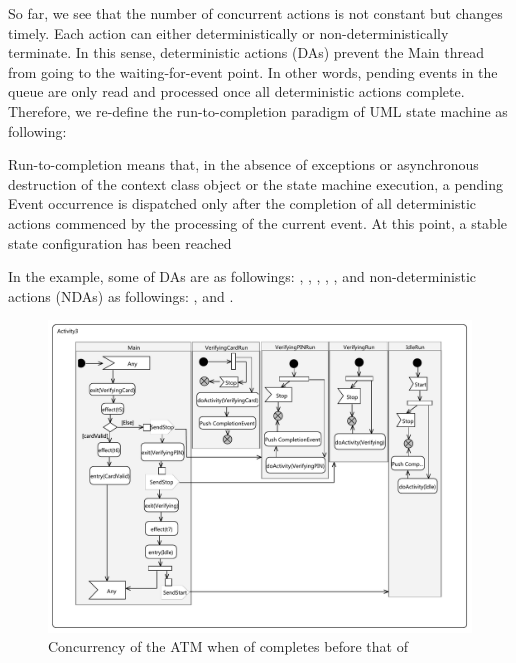 So far, we see that the number of concurrent actions is not constant but changes timely. 
Each action can either deterministically or non-deterministically terminate. 
In this sense, deterministic actions (DAs) prevent the Main thread from going to the waiting-for-event point. 
In other words, pending events in the queue are only read and processed once all deterministic actions complete. Therefore, we re-define the run-to-completion paradigm of UML state machine as following:
 
\begin{definition}
	Run-to-completion means that, in the absence of exceptions or asynchronous destruction of the context	class object or the state machine execution, a pending Event occurrence is dispatched only after the completion of all deterministic actions commenced by the processing of the current event. 
	At this point, a stable state configuration has been reached
\end{definition}

In the example, some of DAs are as followings: , , , , ,  and non-deterministic actions (NDAs) as followings: ,  and .


\begin{figure}
	\centering
	\includegraphics[clip, trim=1.5cm 1.6cm 1.6cm 1.2cm, width=1.03\columnwidth]{figures/ThreadingExample2.pdf}
	\caption{Concurrency of the ATM when  of  completes before that of }
	\label{fig:threading2}
\end{figure}

